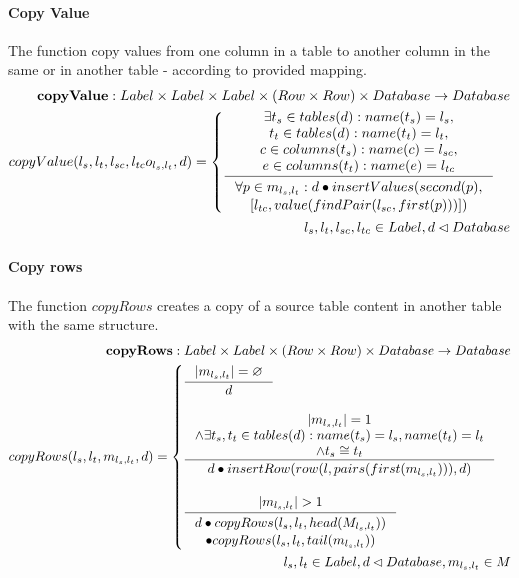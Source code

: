 \documentclass[11pt]{article}
\begin{document}
\paragraph{Copy Value} The function copy values from one column in a table to another column in the same or in another table - according to provided mapping. 
\begin{align*}
	\mathbf{copyValue} : Label \times Label \times Label \times (Row \times Row) \times Database \rightarrow Database \\
	copyValue(l_s, l_t, l_{sc}, l_{tc} o_{l_s, l_t}, d) = \begin{cases}
		\inference{\exists t_s \in tables(d) : name(t_s) = l_s, \\ t_t \in tables(d) : name(t_t) = l_t, \\ c \in columns(t_s) : name(c) = l_{sc}, \\ e \in columns(t_t) : name(e) = l_{tc}}{\begin{gathered}
		\forall	p \in m_{l_s, l_t} :	d \bullet insertValues(second(p), \\ [l_{tc},value(findPair(l_{sc}, first(p)))])
		\end{gathered}}
 	\end{cases} \\
 	l_s, l_t, l_{sc}, l_{tc} \in Label, d \lhd Database
\end{align*}

\paragraph{Copy rows} The function $copyRows$ creates a copy of a source table content in another table with the same structure. 
\begin{align*}
	\mathbf{copyRows} : Label \times Label \times (Row \times Row) \times Database \rightarrow Database \\
	copyRows(l_s, l_t, m_{l_s, l_t}, d) = \begin{cases}
 	\inference{|m_{l_s, l_t}| = \varnothing}{d} \\\\
 	\inference{|m_{l_s, l_t}| = 1 \\ \wedge \exists t_s, t_t \in tables(d) : name(t_s) = l_s, name(t_t) = l_t \\ \wedge t_s \cong t_t }{d \bullet insertRow(row(l, pairs(first(m_{l_s, l_t}))), d)} \\\\
 	\inference{|m_{l_s, l_t}| > 1}{\begin{gathered}
		 d \bullet copyRows(l_s, l_t, head(M_{l_s, l_t})) \\ \bullet copyRows(l_s, l_t, tail(m_{l_s, l_t}))
	\end{gathered}}
  \end{cases} \\
  l_s, l_t \in Label, d \lhd Database, m_{l_s, l_t} \in M
\end{align*}
\end{document}
